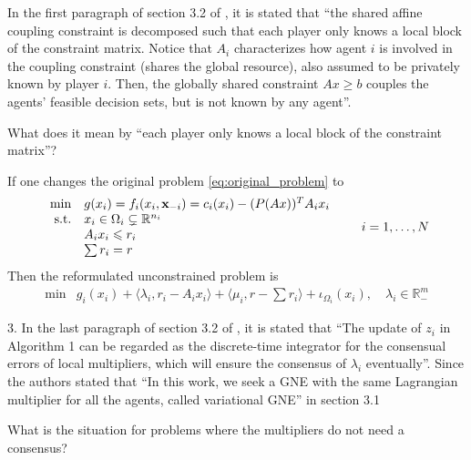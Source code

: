 In the first paragraph of section 3.2 of \citep{Yi_2019}, it is stated that ``\textcolor{red!60}{the shared affine coupling constraint is decomposed such that each player only knows a local block of the constraint matrix. Notice that $A_i$ characterizes how agent $i$ is involved in the coupling constraint (shares the global resource), also assumed to be privately known by player $i$. Then, the globally shared constraint $Ax \geqslant b$ couples the agents’ feasible decision sets, but is not known by any agent}''.

\begin{question}
What does it mean by ``each player only knows a local block of the constraint matrix''?
\end{question}

If one changes the original problem \eqref{eq:original_problem} to
\begin{equation}
\label{eq:new_problem}
\def\arraystretch{1}
\begin{array}{rl}
\min & g(x_i) = f_i(x_i, \mathbf{x}_{-i}) = c_i(x_i) - (P(Ax))^TA_ix_i \\
\text{s.t.} & x_i \in \Omega_i \subsetneq \mathbb{R}^{n_i} \\
& A_ix_i \leqslant r_i \\
& \sum r_i = r
\end{array}
\qquad i = 1, \ldots, N
\end{equation}
Then the reformulated unconstrained problem is
\begin{equation}
\label{eq:reformulated_new_problem}
\begin{array}{rl}
\min & g_i(x_i) + \langle \lambda_i, r_i-A_ix_i \rangle + \langle \mu_i, r - \sum r_i \rangle + \iota_{\Omega_i} (x_i), \quad \lambda_i \in \mathbb{R}_-^m
\end{array}
\end{equation}


3. In the last paragraph of section 3.2 of \citep{Yi_2019}, it is stated that ``\textcolor{red!60}{The update of $z_i$ in Algorithm 1 can be regarded as the discrete-time integrator for the consensual errors of local multipliers, which will ensure the consensus of $\lambda_i$ eventually}''. Since the authors stated that ``In this work, we seek a GNE with the same Lagrangian multiplier for all the agents, called variational GNE'' in section 3.1

\begin{question}
What is the situation for problems where the multipliers do not need a consensus?
\end{question}

